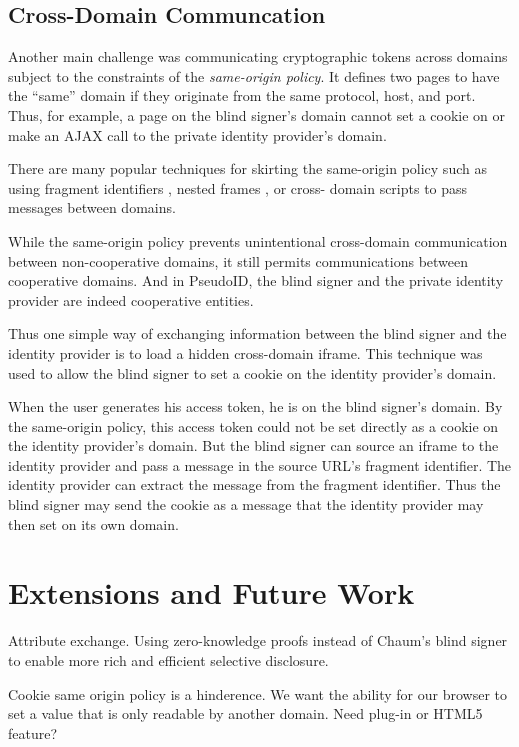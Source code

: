 \documentclass{llncs}
\begin{document}
\subsection{Cross-Domain Communcation}

Another main challenge was communicating cryptographic tokens across domains
subject to the constraints of the \emph{same-origin policy}. It defines two
pages to have the ``same'' domain if they originate from the same protocol,
host, and port. Thus, for example, a page on the blind signer's domain cannot
set a cookie on or make an AJAX call to the private identity provider's domain.

There are many popular techniques for skirting the same-origin policy such as
using fragment identifiers \cite{Adi07}, nested frames \cite{JaWa07}, or cross-
domain scripts to pass messages between domains.

While the same-origin policy prevents unintentional cross-domain communication
between non-cooperative domains, it still permits communications between
cooperative domains. And in PseudoID, the blind signer and the private identity
provider are indeed cooperative entities.

Thus one simple way of exchanging information between the blind signer and the
identity provider is to load a hidden cross-domain iframe. This technique was
used to allow the blind signer to set a cookie on the identity provider's
domain.

When the user generates his access token, he is on the blind signer's domain. By
the same-origin policy, this access token could not be set directly as a cookie
on the identity provider's domain. But the blind signer can source an iframe to
the identity provider and pass a message in the source URL's fragment
identifier. The identity provider can extract the message from the fragment
identifier. Thus the blind signer may send the cookie as a message that the
identity provider may then set on its own domain.

\section{Extensions and Future Work}

Attribute exchange. Using zero-knowledge proofs instead of Chaum's
blind signer to enable more rich and efficient selective
disclosure.

Cookie same origin policy is a hinderence. We want the ability for our
browser to set a value that is only readable by another domain. Need
plug-in or HTML5 feature?
\end{document}
